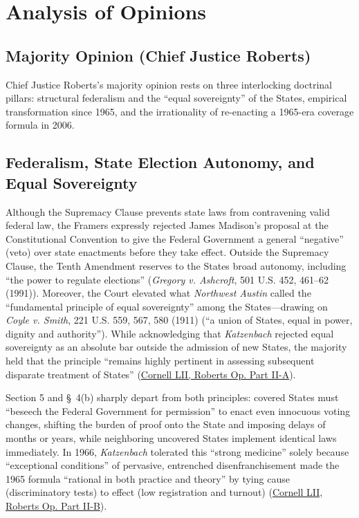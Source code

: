 \documentclass[12pt]{article}
\begin{document}
\section{Analysis of Opinions}
\subsection{Majority Opinion (Chief Justice Roberts)}

Chief Justice Roberts's majority opinion rests on three interlocking doctrinal pillars: structural federalism and the ``equal sovereignty'' of the States, empirical transformation since 1965, and the irrationality of re-enacting a 1965-era coverage formula in 2006.

\subsection{Federalism, State Election Autonomy, and Equal Sovereignty}
Although the Supremacy Clause prevents state laws from contravening valid federal law, the Framers expressly rejected James Madison's proposal at the Constitutional Convention to give the Federal Government a general ``negative'' (veto) over state enactments before they take effect. Outside the Supremacy Clause, the Tenth Amendment reserves to the States broad autonomy, including ``the power to regulate elections'' (\emph{Gregory v. Ashcroft}, 501 U.S. 452, 461--62 (1991)). Moreover, the Court elevated what \emph{Northwest Austin} called the ``fundamental principle of equal sovereignty'' among the States---drawing on \emph{Coyle v. Smith}, 221 U.S. 559, 567, 580 (1911) (``a union of States, equal in power, dignity and authority''). While acknowledging that \emph{Katzenbach} rejected equal sovereignty as an absolute bar outside the admission of new States, the majority held that the principle ``remains highly pertinent in assessing subsequent disparate treatment of States'' (\href{https://www.law.cornell.edu/supremecourt/text/12-96}{Cornell LII, Roberts Op. Part II-A}).

Section 5 and \S~4(b) sharply depart from both principles: covered States must ``beseech the Federal Government for permission'' to enact even innocuous voting changes, shifting the burden of proof onto the State and imposing delays of months or years, while neighboring uncovered States implement identical laws immediately. In 1966, \emph{Katzenbach} tolerated this ``strong medicine'' solely because ``exceptional conditions'' of pervasive, entrenched disenfranchisement made the 1965 formula ``rational in both practice and theory'' by tying cause (discriminatory tests) to effect (low registration and turnout) (\href{https://www.law.cornell.edu/supremecourt/text/12-96}{Cornell LII, Roberts Op. Part II-B}).
\end{document}
